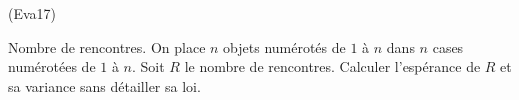 \begin{tiny}(Eva17)\end{tiny} Nombre de rencontres.\newline
On place $n$ objets numérotés de $1$ à $n$ dans $n$ cases numérotées de $1$ à $n$. Soit $R$ le nombre de rencontres. Calculer l'espérance de $R$ et sa variance sans détailler sa loi. 
